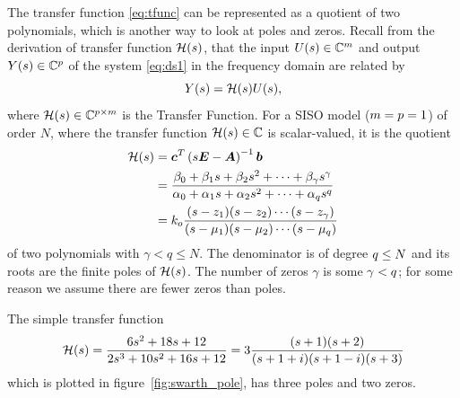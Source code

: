 The transfer function \eqref{eq:tfunc} can be represented as a quotient of two polynomials, which is another way to look at poles and zeros.
 Recall from the derivation of transfer function $\mathcal{H}(s)$, that the input $U(s)\in \mathbb{C}^{m}$ and output $Y(s)\in \mathbb{C}^{p}$ of the system \eqref{eq:ds1} in the frequency domain are related by
\[
Y(s) = \mathcal{H}(s)U(s),
\]
where $\mathcal{H}(s)\in\mathbb{C}^{p\times m}$ is the Transfer Function. 
For a SISO model ($m=p=1$) of order $N$, where the transfer function $\mathcal{H}(s)\in\mathbb{C}$ is scalar-valued, it is the quotient 
\begin{equation}
\begin{aligned}
\mathcal{H}(s) &= \bm{c}^T \left(s\bm{E}-\bm{A}\right)^{-1} \bm{b}\\
&= \frac{\beta_0 + \beta_1 s + \beta_2 s^2 +  \cdots + \beta_{\gamma}s^{\gamma}}{\alpha_0 + \alpha_1 s + \alpha_2 s^2 + \cdots + \alpha_q s^q}\\
&= k_o\dfrac{(s-z_1)(s-z_2)\cdots(s-z_{\gamma})}{(s-\mu_1)(s-\mu_2)\cdots(s-\mu_q)}
\end{aligned}
\label{eq:tfunc_quot1}
\end{equation}
of two polynomials with $\gamma<q\leq N$. The denominator is of degree $q\leq N$ and its roots are the finite poles of $\mathcal{H}(s)$.  The number of zeros $\gamma$ is some  $\gamma < q$;  for some reason we assume there are fewer zeros than poles. 
      

\medskip
The simple transfer function 
\begin{equation}
\mathcal{H}(s) = \frac{6s^2+18s+12}{2s^3+10s^2+16s+12}
 = 3\frac{(s+1)(s+2)}{(s+ 1 +i)(s+1-i)(s+3)}
\label{eq:3pole}
\end{equation}
which is plotted in figure~\ref{fig:swarth_pole}, has three poles and two zeros.  


